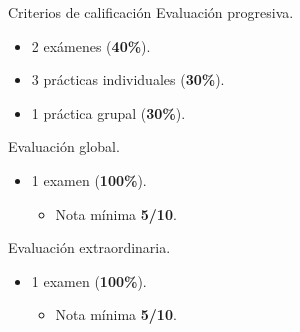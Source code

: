 \begin{frame}{Criterios de calificación}
\alert{\Large Evaluación progresiva.}
\begin{itemize}
    \item 2 exámenes (\alert{\textbf{40\%}}).
    \item 3 prácticas individuales (\alert{\textbf{30\%}}).
    \item 1 práctica grupal (\alert{\textbf{30\%}}).
\end{itemize}

\alert{\Large Evaluación global.}
\begin{itemize}
    \item 1 examen (\alert{\textbf{100\%}}).
    \begin{itemize}
        \item Nota mínima \textbf{5/10}.
    \end{itemize}
\end{itemize}

\alert{\Large Evaluación extraordinaria.}
\begin{itemize}
    \item 1 examen (\alert{\textbf{100\%}}).
    \begin{itemize}
        \item Nota mínima \textbf{5/10}.
    \end{itemize}
\end{itemize}
\end{frame}

